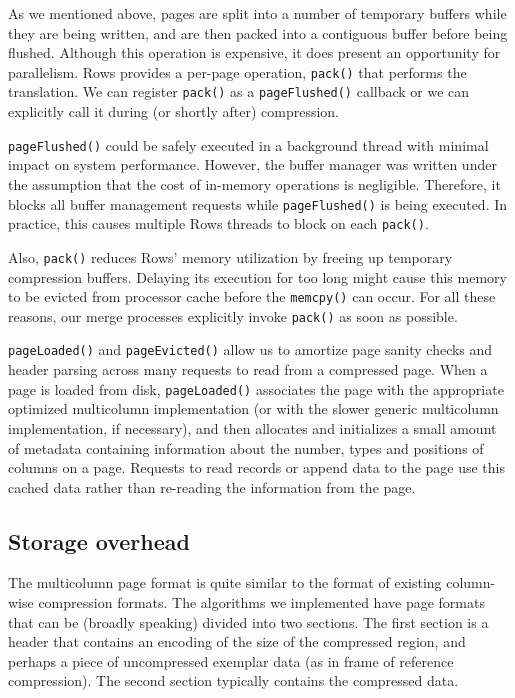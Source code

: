 \documentclass{sig-alternate-sigmod08}
\newcommand{\rows}{Rows\xspace}
\newcommand{\rowss}{Rows'\xspace}
\begin{document}
As we mentioned above, pages are split into a number of temporary
buffers while they are being written, and are then packed into a
contiguous buffer before being flushed.  Although this operation is
expensive, it does present an opportunity for parallelism.  \rows
provides a per-page operation, {\tt pack()} that performs the
translation.  We can register {\tt pack()} as a {\tt pageFlushed()}
callback or we can explicitly call it during (or shortly after)
compression.

{\tt pageFlushed()} could be safely executed in a background thread
with minimal impact on system performance.  However, the buffer
manager was written under the assumption that the cost of in-memory
operations is negligible.  Therefore, it blocks all buffer management
requests while {\tt pageFlushed()} is being executed.  In practice,
this causes multiple \rows threads to block on each {\tt pack()}.

Also, {\tt pack()} reduces \rowss memory utilization by freeing up
temporary compression buffers.  Delaying its execution for too long
might cause this memory to be evicted from processor cache before the
{\tt memcpy()} can occur.  For all these reasons, our merge processes
explicitly invoke {\tt pack()} as soon as possible.

{\tt pageLoaded()} and {\tt pageEvicted()} allow us to amortize page
sanity checks and header parsing across many requests to read from a
compressed page.  When a page is loaded from disk, {\tt pageLoaded()}
associates the page with the appropriate optimized multicolumn
implementation (or with the slower generic multicolumn implementation,
if necessary), and then allocates and initializes a small amount of
metadata containing information about the number, types and positions
of columns on a page.  Requests to read records or append data to the
page use this cached data rather than re-reading the information from
the page.

\subsection{Storage overhead}

The multicolumn page format is quite similar to the format of existing
column-wise compression formats.  The algorithms we implemented have
page formats that can be (broadly speaking) divided into two sections.
The first section is a header that contains an encoding of the size of
the compressed region, and perhaps a piece of uncompressed exemplar
data (as in frame of reference compression).  The second section
typically contains the compressed data.
\end{document}
